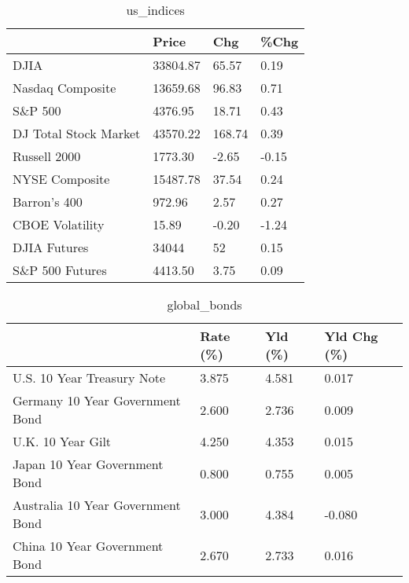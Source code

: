 \documentclass{article}%
\begin{document}
%


\begin{table}[htbp]%
\caption{us\_indices}%
\centering%
\begin{adjustbox}{width=1\textwidth}%
\begin{tabular}{llll}
\toprule
                      &    Price &    Chg &  \%Chg \\
\midrule
                 DJIA & 33804.87 &  65.57 &  0.19 \\
     Nasdaq Composite & 13659.68 &  96.83 &  0.71 \\
              S\&P 500 &  4376.95 &  18.71 &  0.43 \\
DJ Total Stock Market & 43570.22 & 168.74 &  0.39 \\
         Russell 2000 &  1773.30 &  -2.65 & -0.15 \\
       NYSE Composite & 15487.78 &  37.54 &  0.24 \\
         Barron's 400 &   972.96 &   2.57 &  0.27 \\
      CBOE Volatility &    15.89 &  -0.20 & -1.24 \\
         DJIA Futures &    34044 &     52 &  0.15 \\
      S\&P 500 Futures &  4413.50 &   3.75 &  0.09 \\
\bottomrule
\end{tabular}
%
\end{adjustbox}%
\end{table}

%


\begin{table}[htbp]%
\caption{global\_bonds}%
\centering%
\begin{adjustbox}{width=1\textwidth}%
\begin{tabular}{llll}
\toprule
                                  & Rate (\%) & Yld (\%) & Yld Chg (\%) \\
\midrule
       U.S. 10 Year Treasury Note &    3.875 &   4.581 &       0.017 \\
  Germany 10 Year Government Bond &    2.600 &   2.736 &       0.009 \\
                U.K. 10 Year Gilt &    4.250 &   4.353 &       0.015 \\
    Japan 10 Year Government Bond &    0.800 &   0.755 &       0.005 \\
Australia 10 Year Government Bond &    3.000 &   4.384 &      -0.080 \\
    China 10 Year Government Bond &    2.670 &   2.733 &       0.016 \\
\bottomrule
\end{tabular}
%
\end{adjustbox}%
\end{table}
\end{document}
